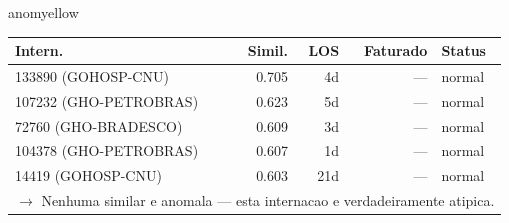 \documentclass[a4paper,10pt]{article}
\begin{document}
\begin{anomalycard}[Internacao 7536 | GHO-PETROBRAS | MODERADO (z=2.33)]{anomyellow}
\begin{tabular}{l r r r l}\toprule\textbf{Intern.} & \textbf{Simil.} & \textbf{LOS} & \textbf{Faturado} & \textbf{Status} \\\midrule
133890 (GOHOSP-CNU) & 0.705 & 4d & --- & \textcolor{jcubeblue}{normal} \\
107232 (GHO-PETROBRAS) & 0.623 & 5d & --- & \textcolor{jcubeblue}{normal} \\
72760 (GHO-BRADESCO) & 0.609 & 3d & --- & \textcolor{jcubeblue}{normal} \\
104378 (GHO-PETROBRAS) & 0.607 & 1d & --- & \textcolor{jcubeblue}{normal} \\
14419 (GOHOSP-CNU) & 0.603 & 21d & --- & \textcolor{jcubeblue}{normal} \\
\multicolumn{5}{l}{\textcolor{jcubeblue}{\small $\rightarrow$ Nenhuma similar e anomala --- esta internacao e verdadeiramente atipica.}} \\
\bottomrule\end{tabular}


\end{anomalycard}

\newpage
\end{document}
